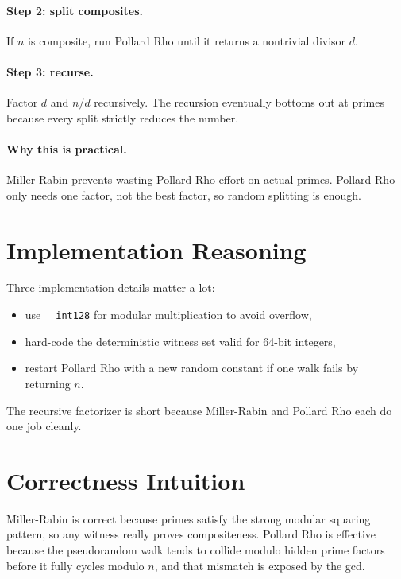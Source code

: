 \paragraph{Step 2: split composites.}
If \(n\) is composite, run Pollard Rho until it returns a nontrivial divisor \(d\).

\paragraph{Step 3: recurse.}
Factor \(d\) and \(n/d\) recursively. The recursion eventually bottoms out at primes because every split strictly
reduces the number.

\paragraph{Why this is practical.}
Miller-Rabin prevents wasting Pollard-Rho effort on actual primes. Pollard Rho only needs one factor, not the best
factor, so random splitting is enough.

\section*{Implementation Reasoning}

Three implementation details matter a lot:

\begin{itemize}
  \item use \texttt{\_\_int128} for modular multiplication to avoid overflow,
  \item hard-code the deterministic witness set valid for 64-bit integers,
  \item restart Pollard Rho with a new random constant if one walk fails by returning \(n\).
\end{itemize}

The recursive factorizer is short because Miller-Rabin and Pollard Rho each do one job cleanly.

\section*{Correctness Intuition}

Miller-Rabin is correct because primes satisfy the strong modular squaring pattern, so any witness really proves
compositeness. Pollard Rho is effective because the pseudorandom walk tends to collide modulo hidden prime factors before
it fully cycles modulo \(n\), and that mismatch is exposed by the gcd.

